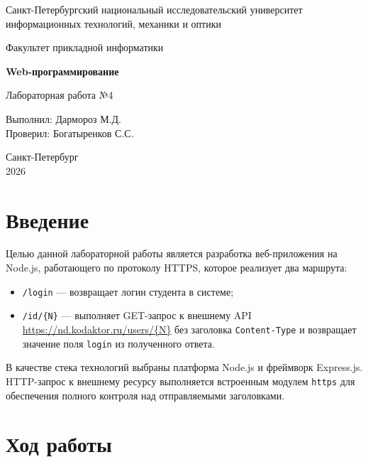 \documentclass[a4paper,12pt]{article}
\begin{document}
\pagestyle{empty}


\begin{center}
Санкт-Петербургский национальный исследовательский университет\\
информационных технологий, механики и оптики

\vfill
Факультет прикладной информатики

\vfill
\textbf{Web-программирование}

Лабораторная работа №4
\end{center}

\vfill

\begin{flushright}
Выполнил: Дармороз М.Д.\\
Проверил: Богатыренков С.С.
\end{flushright}

\vfill

\begin{center}
Санкт-Петербург\\
2026
\end{center}

\newpage
\pagestyle{plain}

\section{Введение}

Целью данной лабораторной работы является разработка веб-приложения на
Node.js, работающего по протоколу HTTPS, которое реализует два маршрута:
\begin{itemize}
  \item \texttt{/login} --- возвращает логин студента в системе;
  \item \texttt{/id/\{N\}} --- выполняет GET-запрос к внешнему API
        \url{https://nd.kodaktor.ru/users/\{N\}} без заголовка
        \texttt{Content-Type} и возвращает значение поля \texttt{login}
        из полученного ответа.
\end{itemize}

В качестве стека технологий выбраны платформа Node.js и фреймворк
Express.js. HTTP-запрос к внешнему ресурсу выполняется встроенным
модулем \texttt{https} для обеспечения полного контроля над
отправляемыми заголовками.

\section{Ход работы}
\end{document}
